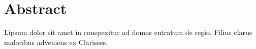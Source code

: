 \vspace*{\fill}
\section*{Abstract}
Lipsum dolor sit amet in conspexitur ad domus entratum de regio. Filius clarus maloribus adveniens ex Clarisses.
\vspace*{\fill}
